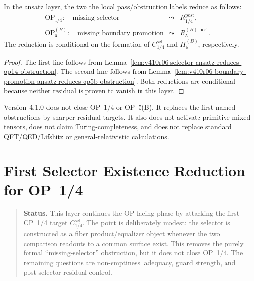 \begin{theorem}
\label{thm:v410r06-first-op-facing-obstruction-reduction}
In the ansatz layer, the two the local pass/obstruction labels reduce as follows:
\[
\begin{array}{rcl}
\mathrm{OP}_{1/4}:\quad
\text{missing selector}
&\leadsto&
R_{1/4}^{\mathrm{post}},\\[0.3em]
\mathrm{OP}_{5}^{(B)}:\quad
\text{missing boundary promotion}
&\leadsto&
R_{5}^{(B),\mathrm{post}}.
\end{array}
\]
The reduction is conditional on the formation of
\(C_{1/4}^{\mathrm{sel}}\) and \(\Pi_{5}^{(B)}\), respectively.
\end{theorem}

\begin{proof}
The first line follows from Lemma~\ref{lem:v410r06-selector-ansatz-reduces-op14-obstruction}.
The second line follows from Lemma~\ref{lem:v410r06-boundary-promotion-ansatz-reduces-op5b-obstruction}.
Both reductions are conditional because neither residual is proven to vanish in
this layer.
\end{proof}

\begin{remark}
\label{rem:v410r06-non-claim}
Version~4.1.0-does not close OP~1/4 or OP~5(B). It replaces the first
named obstructions by sharper residual targets. It also does not activate
primitive mixed tensors, does not claim Turing-completeness, and does not
replace standard QFT/QED/Lifshitz or general-relativistic calculations.
\end{remark}



\clearpage
\section{First Selector Existence Reduction for OP~1/4}
\label{sec:v410r07-selector-existence-reduction-op14}

\begin{quote}\small
\noindent\textbf{Status.}
This layer continues the OP-facing phase by attacking the first OP~1/4 target
\(C_{1/4}^{\mathrm{sel}}\). The point is deliberately modest: the selector is
constructed as a fiber product/equalizer object whenever the two comparison
readouts to a common surface exist. This removes the purely formal
``missing-selector'' obstruction, but it does not close OP~1/4. The remaining
questions are non-emptiness, adequacy, guard strength, and post-selector
residual control.
\end{quote}

